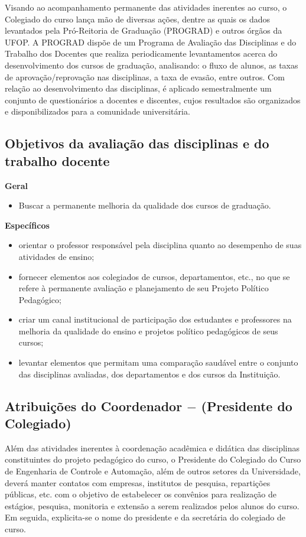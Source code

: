Visando ao acompanhamento permanente das atividades inerentes ao curso, o Colegiado do curso lança mão de diversas ações, dentre as quais os dados levantados pela Pró-Reitoria de Graduação (PROGRAD) e outros órgãos da UFOP. A PROGRAD dispõe de um Programa de Avaliação das Disciplinas e do Trabalho dos Docentes que realiza periodicamente levantamentos acerca do desenvolvimento dos cursos de graduação, analisando: o fluxo de alunos, as taxas de aprovação/reprovação nas disciplinas, a taxa de evasão, entre outros. Com relação ao desenvolvimento das disciplinas, é aplicado semestralmente um conjunto de questionários a docentes e discentes, cujos resultados são organizados e disponibilizados para a comunidade universitária.  

\subsection*{Objetivos da avaliação das disciplinas e do trabalho docente}

\textbf{Geral}

\begin{itemize}
\item Buscar a permanente melhoria da qualidade dos cursos de graduação.
\end{itemize}

\textbf{Específicos}

\begin{itemize}
\item orientar o professor responsável pela disciplina quanto ao desempenho de suas atividades de ensino;
\item fornecer elementos aos colegiados de cursos, departamentos, etc., no que se refere à permanente avaliação e planejamento de seu Projeto Político Pedagógico;
\item criar um canal institucional de participação dos estudantes e professores na melhoria da qualidade do ensino e projetos político pedagógicos de seus cursos;
\item levantar elementos que permitam uma comparação saudável entre o conjunto das disciplinas avaliadas, dos departamentos e dos cursos da Instituição.
\end{itemize}

\subsection*{Atribuições do Coordenador $-$ (Presidente do Colegiado)}

Além das atividades inerentes à coordenação acadêmica e didática das disciplinas constituintes do projeto pedagógico do curso, o Presidente do Colegiado do Curso de Engenharia de Controle e Automação, além de outros setores da Universidade, deverá manter contatos com empresas, institutos de pesquisa, repartições públicas, etc. com o objetivo de estabelecer os convênios para realização de estágios, pesquisa, monitoria e extensão a serem realizados pelos alunos do curso. Em seguida, explicita-se o nome do presidente e da secretária do colegiado de curso.

